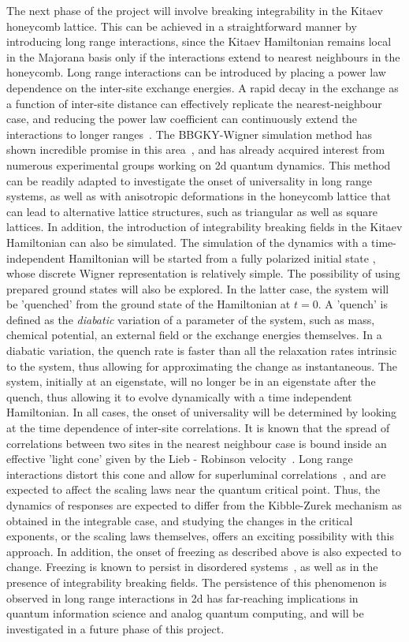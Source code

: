 \documentclass[a4paper,11pt,color]{article}
\begin{document}
The next phase of the project will involve breaking integrability in the Kitaev honeycomb lattice. This can be achieved in a straightforward manner by introducing long range interactions, since the Kitaev Hamiltonian remains local in the Majorana basis only if the interactions extend to nearest neighbours in the honeycomb. Long range interactions can be introduced by placing a power law dependence on the inter-site exchange energies. A rapid decay in the exchange as a function of inter-site distance can effectively replicate the nearest-neighbour case, and reducing the power law coefficient can continuously extend the interactions to longer ranges~\cite{bollinger}. The BBGKY-Wigner simulation method has shown incredible promise in this area~\cite{bbgky}, and has already acquired interest from numerous experimental groups working on 2d quantum dynamics. This method can be readily adapted to investigate the onset of universality in long range systems, as well as with anisotropic deformations in the honeycomb lattice that can lead to alternative lattice structures, such as triangular as well as square lattices. In addition, the introduction of integrability breaking fields in the Kitaev Hamiltonian can also be simulated. The simulation of the dynamics  with a time-independent Hamiltonian will be started from a fully polarized initial state , whose discrete Wigner representation is relatively simple. The possibility of using prepared ground states will also be explored. In the latter case, the system will be 'quenched' from the ground state of the Hamiltonian at $t=0$. A 'quench' is defined as the \textit{diabatic} variation of a {parameter} of the system, such as  mass, chemical potential, an external field or the exchange energies themselves. In a diabatic variation, the quench rate is faster than all the relaxation rates intrinsic to the system, thus allowing for approximating the change as instantaneous. The system, initially at an eigenstate, will no longer be in an eigenstate after the quench, thus allowing it to evolve dynamically with a time independent Hamiltonian. In all cases, the onset of universality will be determined by looking at the time dependence of inter-site correlations. It is known that the spread of correlations between two sites in the nearest neighbour case is bound inside an effective 'light cone' given by the Lieb - Robinson velocity~\cite{lr}. Long range interactions distort this cone and allow for superluminal correlations~\cite{michael}, and are expected to affect the scaling laws near the quantum critical point. Thus, the dynamics of responses are expected to differ from the Kibble-Zurek mechanism as obtained in the integrable case, and studying the changes in the critical exponents, or the scaling laws themselves, offers an exciting possibility with this approach. In addition, the onset of freezing as described above is also expected to change. Freezing is known to persist in disordered systems~\cite{freezing}, as well as in the presence of integrability breaking fields. The persistence of this phenomenon is observed in long range interactions in 2d has far-reaching implications in quantum information science and analog quantum computing, and will be investigated in a future phase of this project.
\end{document}
